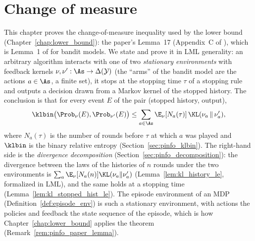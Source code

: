 \chapter{Change of measure}
\label{chap:pre_info}

This chapter proves the change-of-measure inequality used by the lower bound
(Chapter~\ref{chap:lower_bound}): the paper's Lemma~17 (Appendix~C of
\cite{essakine2026tight}), which is Lemma~1 of \cite{kaufmann2016complexity} for bandit models.
We state and prove it in LML generality: an arbitrary algorithm interacts with one of two
\emph{stationary environments} with feedback kernels $\nu, \nu' : \As \to \Delta(\mathcal Y)$
(the ``arms'' of the bandit model are the actions $a \in \As$, a finite set), it stops at the
stopping time $\tau$ of a stopping rule and outputs a decision drawn from a Markov kernel of
the stopped history. The conclusion is that for every event $E$ of the pair (stopped history,
output),
\[
  \klbin\big(\Prob_\nu(E), \Prob_{\nu'}(E)\big)
  \le \sum_{a \in \As} \E_\nu[N_a(\tau)]\,\KL(\nu_a \,\|\, \nu'_a),
\]
where $N_a(\tau)$ is the number of rounds before $\tau$ at which $a$ was played and $\klbin$
is the binary relative entropy (Section~\ref{sec:pinfo_klbin}). The right-hand side is the
\emph{divergence decomposition} (Section~\ref{sec:pinfo_decomposition}): the divergence between
the laws of the histories of $n$ rounds under the two environments is
$\sum_a \E_\nu[N_a(n)] \KL(\nu_a\|\nu'_a)$ (Lemma~\ref{lem:kl_history_le}, formalized in LML),
and the same holds at a stopping time (Lemma~\ref{lem:kl_stopped_hist_le}). The episode
environment of an MDP (Definition~\ref{def:episode_env}) is such a stationary environment, with
actions the policies and feedback the state sequence of the episode, which is how
Chapter~\ref{chap:lower_bound} applies the theorem (Remark~\ref{rem:pinfo_paper_lemma}).

